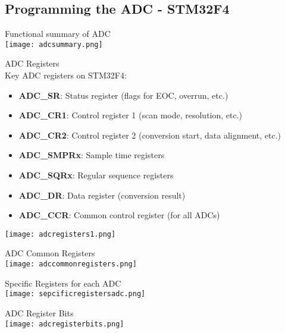 \subsection{Programming the ADC - STM32F4}

\begin{definition}{Functional summary of ADC}\\
    \texttt{[image: adcsummary.png]}
\end{definition}

\begin{definition}{ADC Registers}\\
Key ADC registers on STM32F4:
\begin{itemize}
    \item \textbf{ADC\_SR}: Status register (flags for EOC, overrun, etc.)
    \item \textbf{ADC\_CR1}: Control register 1 (scan mode, resolution, etc.)
    \item \textbf{ADC\_CR2}: Control register 2 (conversion start, data alignment, etc.)
    \item \textbf{ADC\_SMPRx}: Sample time registers
    \item \textbf{ADC\_SQRx}: Regular sequence registers
    \item \textbf{ADC\_DR}: Data register (conversion result)
    \item \textbf{ADC\_CCR}: Common control register (for all ADCs)
\end{itemize}
\texttt{[image: adcregisters1.png]}\\
\end{definition}

\begin{concept}{ADC Common Registers}\\
    \texttt{[image: adccommonregisters.png]}
\end{concept}

\begin{concept}{Specific Registers for each ADC}\\
    \texttt{[image: sepcificregistersadc.png]}
\end{concept}

\begin{theorem}{ADC Register Bits}\\
    \texttt{[image: adcregisterbits.png]}
\end{theorem}

